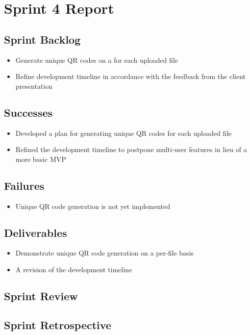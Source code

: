 
\section{Sprint 4 Report}
\label{sec:Sprint4_report}
    \subsection{Sprint Backlog}
    \label{sec:Sprint4_backlog}
        \begin{itemize}
            \item Generate unique QR codes on a for each uploaded file
            \item Refine development timeline in accordance with the feedback from the client presentation
        \end{itemize}

    \subsection{Successes}
    \label{sec:Sprint4_successes}
        \begin{itemize}
            \item Developed a plan for generating unique QR codes for each uploaded file
            \item Refined the development timeline to postpone multi-user features in lieu of a more basic MVP
        \end{itemize}

    \subsection{Failures}
    \label{sec:Sprint4_failures}
        \begin{itemize}
            \item Unique QR code generation is not yet implemented 
        \end{itemize}

    \subsection{Deliverables}
    \label{sec:Sprint4_deliverables}
    \begin{itemize}
        \item Demonstrate unique QR code generation on a per-file basis
        \item A revision of the development timeline
    \end{itemize}

    \subsection{Sprint Review}
    \label{sec:Sprint4_review}

    \subsection{Sprint Retrospective}
    \label{sec:Sprint4_retrospective}
